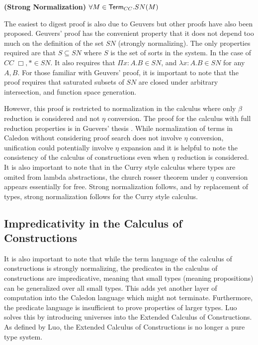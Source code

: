 \begin{theorem}
\textbf{(Strong Normalization)} $\forall M \in \mathsf{Term}_{CC}. SN(M)$
\label{cc:cons}
\end{theorem}

The easiest to digest proof is also due to Geuvers \citep{Geuvers94ashort} 
but other proofs have also been proposed.  Geuvers' proof has the convenient
property that it does not depend too much on the definition of the set $SN$ 
(strongly normalizing). The only properties required are that $S \subseteq SN$ 
where $S$ is the set of sorts in the system. In the case of $CC$ $\Box,* \in SN$.
It also requires that $\Pi x : A . B \in SN$, and $\lambda x : A . B \in SN$ 
for any $A,B$.  For those familiar with Geuvers' proof, 
it is important to note that the proof requires that saturated subsets of $SN$ are closed under
arbitrary intersection, and function space generation.

However, this proof is restricted to normalization in the calculus where only $\beta$ reduction 
is considered and not $\eta$ conversion.  The proof for the calculus with full reduction properties is
in Guevers' thesis \citep{geuvers1993logics}.  While normalization of terms in Caledon without considering proof search does
not involve $\eta$ conversion, unification could potentially involve $\eta$ expansion and it is helpful to note
the consistency of the calculus of constructions even when $\eta$ reduction is considered.  
It is also important to note that in the Curry style calculus where types are omited from lambda abstractions, 
the church rosser theorem under $\eta$ conversion appears essentially for free\citep{miquel2001implicit}. Strong normalization 
follows, and by replacement of types, strong normalization follows for the Curry style calculus.

\subsection{Impredicativity in the Calculus of Constructions}

It is also important to note that while the term language of the calculus of constructions is strongly normalizing, 
the predicates in the calculus of constructions are impredicative, meaning that small types (meaning propositions) can be generalized over all small types.
This adds yet another layer of computation into the Caledon language which might not terminate.  
Furthermore, the predicate language is insufficient to prove properties of larger types. 
Luo \citep{luo1989ecc} solves this by introducing universes into the Extended Calculus of Constructions.  
As defined by Luo, the Extended Calculus of Constructions is no longer a pure type system.

